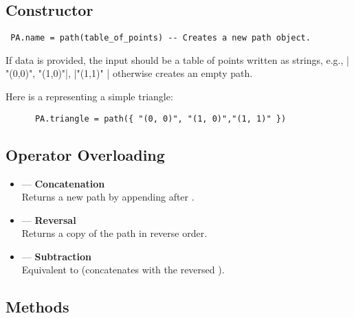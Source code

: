 \subsection{Constructor}

\begin{center}
  \begin{verbatim}
 PA.name = path(table_of_points) -- Creates a new path object.
  \end{verbatim}
\end{center}


If data is provided, the input should be a table of points written as strings, e.g., |{ "(0,0)", "(1,0)"|, |"(1,1)" }| otherwise creates an empty path.

Here is a  representing a simple triangle:

  \begin{mybox}
    \begin{verbatim}
      PA.triangle = path({ "(0, 0)", "(1, 0)","(1, 1)" })
    \end{verbatim}
  \end{mybox}



\subsection{Operator Overloading}

\begin{itemize}
  \item {} — \textbf{Concatenation} \\
  Returns a new path by appending  after .

  \item {} — \textbf{Reversal} \\
  Returns a copy of the path in reverse order.

  \item {} — \textbf{Subtraction} \\
  Equivalent to  (concatenates  with the reversed ).
\end{itemize}


\subsection{Methods}

